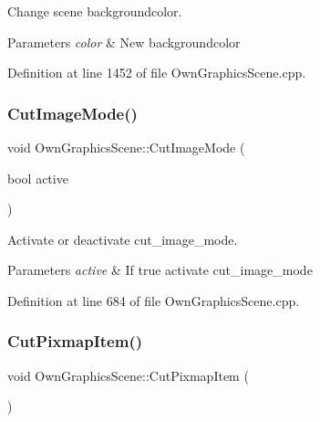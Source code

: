 Change scene backgroundcolor. 


\begin{DoxyParams}{Parameters}
{\em color} & New backgroundcolor \\
\hline
\end{DoxyParams}


Definition at line 1452 of file Own\+Graphics\+Scene.\+cpp.

\mbox{\label{classOwnGraphicsScene_a3ce5a34cebcc134ecb20323c48e5812b}} 
\subsubsection{\texorpdfstring{Cut\+Image\+Mode()}{CutImageMode()}}
{\footnotesize\ttfamily void Own\+Graphics\+Scene\+::\+Cut\+Image\+Mode (\begin{DoxyParamCaption}\item[{bool}]{active }\end{DoxyParamCaption})}



Activate or deactivate cut\+\_\+image\+\_\+mode. 


\begin{DoxyParams}{Parameters}
{\em active} & If true activate cut\+\_\+image\+\_\+mode \\
\hline
\end{DoxyParams}


Definition at line 684 of file Own\+Graphics\+Scene.\+cpp.

\mbox{\label{classOwnGraphicsScene_a7e3d97c27cca1df796b75cc4a99e24cd}} 
\subsubsection{\texorpdfstring{Cut\+Pixmap\+Item()}{CutPixmapItem()}}
{\footnotesize\ttfamily void Own\+Graphics\+Scene\+::\+Cut\+Pixmap\+Item (\begin{DoxyParamCaption}{ }\end{DoxyParamCaption})}



